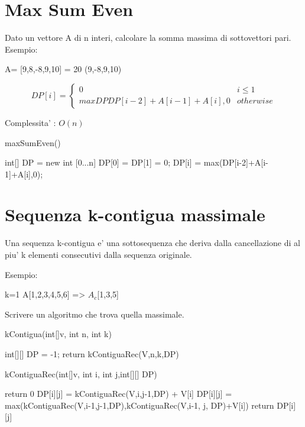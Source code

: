 \documentclass[oneside]{book}
\begin{document}
\section{Max Sum Even}
Dato un vettore A di n interi, calcolare la somma massima di sottovettori pari. Esempio:

A= [9,8,-8,9,10]  = 20 (9,-8,9,10)

\begin{equation}
  DP[i] =
    \begin{cases}
     0 & i \leq 1 \\
     maxDP{DP[i-2]+A[i-1]+A[i],0} & otherwise
    \end{cases}  
\end{equation}

Complessita' : $O(n)$

\begin{algorithm}
\caption{maxSumEven()\label{alg:cap}}
\begin{algorithmic}
\State int[] DP = new int [0...n]
\State DP[0] = DP[1] = 0;
	\State DP[i] = max(DP[i-2]+A[i-1]+A[i],0);
\EndFor
\end{algorithmic}
\end{algorithm}
\section{Sequenza k-contigua massimale}
Una sequenza k-contigua e' una sottosequenza che deriva dalla cancellazione di al piu' k elementi consecutivi dalla sequenza originale.

Esempio: 

k=1
A[1,2,3,4,5,6] => $A_c$[1,3,5] 

Scrivere un algoritmo che trova quella massimale.

\begin{algorithm}
\caption{kContigua(int[]v, int n, int k)\label{cap:alg}}
\begin{algorithmic}
\State int[][] DP = -1;
\State return kContiguaRec(V,n,k,DP)
\end{algorithmic}
\end{algorithm}

\begin{algorithm}
\caption{kContiguaRec(int[]v, int i, int j,int[][] DP)\label{cap:alg}}
\begin{algorithmic}
	\State return 0
\EndIf
{}
		\State DP[i][j] = kContiguaRec(V,i,j-1,DP) + V[i]
	\Else
		\State DP[i][j] = max(kContiguaRec(V,i-1,j-1,DP),kContiguaRec(V,i-1, j, DP)+V[i])
	\EndIf
\EndIf		
return DP[i][j]
\end{algorithmic}
\end{algorithm}
\end{document}
